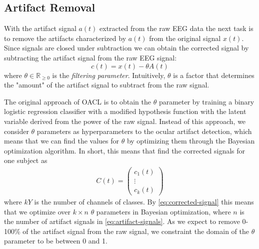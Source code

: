 \subsection{Artifact Removal}
With the artifact signal $a(t)$ extracted from the raw EEG data the next task is to remove the artifacts characterized by $a(t)$ from the original signal $x(t)$. Since signals are closed under subtraction we can obtain the corrected signal by subtracting the artifact signal from the raw EEG signal:
\begin{equation}\label{eq:corrected-signal}
c(t) = x(t) - \theta A(t)
\end{equation}
where $\theta \in \mathbb{R}_{\geq 0}$ is the \emph{filtering parameter}. Intuitively, $\theta$ is a factor that determines the "amount" of the artifact signal to subtract from the raw signal. 

The original approach of OACL is to obtain the $\theta$ parameter by training a binary logistic regression classifier with a modified hypothesis function with the latent variable derived from the power of the raw signal. Instead of this approach, we consider $\theta$ parameters as hyperparameters to the ocular artifact detection, which means that we can find the values for $\theta$ by optimizing them through the Bayesian optimization algorithm. In short, this means that find the corrected signals for one subject as
\begin{align}\label{eq:corrected-signal}
C(t)=  \begin{pmatrix}
c_1(t) \\
\vdots  \\
c_{k}(t) 
\end{pmatrix}
\end{align}
where $kY$ is the number of channels of classes. By \cref{eq:corrected-signal} this means that we optimize over $k \times n$ $\theta$ parameters in Bayesian optimization, where $n$ is the number of artifact signals in \cref{eq:artifact-signals}. As we expect to remove 0-100\% of the artifact signal from the raw signal, we constraint the domain of the $\theta$ parameter to be between 0 and 1.  

